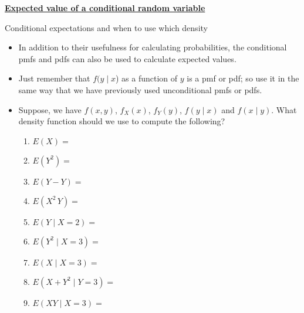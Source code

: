 \documentclass{article}
\newcommand{\bu}[1]{\textbf{\ul{#1}}}				%
\begin{document}
\bu{Expected value of a conditional random variable}\bigskip

Conditional expectations and when to use which density\bigskip
\begin{itemize}
    \item In addition to their usefulness for calculating probabilities, the conditional pmfs and pdfs can also be used to calculate expected values.
    \item[] Just remember that $f(y \mid x$) as a function of $y$ is a pmf or pdf; so use it in the same way that we have previously used unconditional pmfs or pdfs. 
    \item Suppose, we have $f(x,y)$, $f_X(x)$, $f_Y(y)$, $f(y \mid x)$ and $f(x \mid y)$. What density function should we use to compute the following?
    \begin{enumerate}
        \item $E(X) = $\vspace{15pt}
        \item $E(Y^2) = $\vspace{15pt}
        \item $E(Y - Y) = $\vspace{15pt}
        \item $E(X^2 \, Y) = $\vspace{15pt}
        \item $E(Y \mid X = 2) = $\vspace{15pt}
        \item $E(Y^2 \mid X = 3) = $\vspace{15pt}
        \item  $E(X \mid X = 3) = $\vspace{15pt}
        \item $E(X + Y^2 \mid Y = 3) = $\vspace{25pt}
        \item $E(XY \mid X = 3) = $\vspace{25pt}
    \end{enumerate}
\end{itemize}\bigskip
\end{document}
